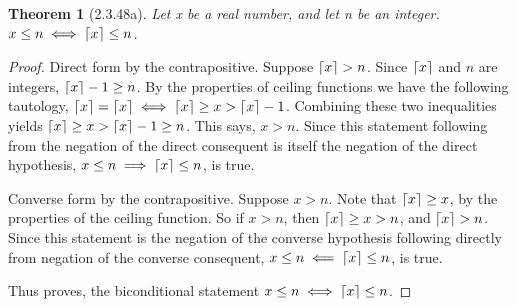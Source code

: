 \documentclass[a4paper, 12pt]{article}
\theoremstyle{plain}
\newtheorem*{theorem*}{Theorem}
\DeclarePairedDelimiter{\ceil}{\lceil}{\rceil}
\begin{document}
	
	\begin{theorem*}[2.3.48a]
		Let x be a real number, and let n be an integer. \newline $x \le n \iff \ceil{x} \le n$.
	\end{theorem*}
	
	\begin{proof}
		Direct form by the contrapositive. Suppose $\ceil{x} > n$. Since $\ceil{x}$ and $n$ are 
		integers, $\ceil{x} - 1 \ge n$. By the properties of ceiling functions we have the 
		following tautology, $\ceil{x} = \ceil{x} \iff \ceil{x} \ge x > \ceil{x} - 1$. Combining 
		these two inequalities yields $\ceil{x} \ge x > \ceil{x} - 1 \ge n$. This says, $x > n$. 
		Since this statement following from the negation of the direct consequent is itself the 
		negation of the direct hypothesis, $x \le n \implies \ceil{x} \le n$, is true.
		
		Converse form by the contrapositive. Suppose $x > n$. Note that $\ceil{x} \ge x$, by the 
		properties of the ceiling function. So if $x > n$, then $\ceil{x} \ge x > n$, and 
		$\ceil{x} > n$. Since this statement is the negation of the converse hypothesis following 
		directly from negation of the converse consequent, \newline 
		$x \le n \impliedby \ceil{x} \le n$, is true.
		
		Thus proves, the biconditional statement $x \le n \iff \ceil{x} \le n$. 
	\end{proof}
\end{document}
